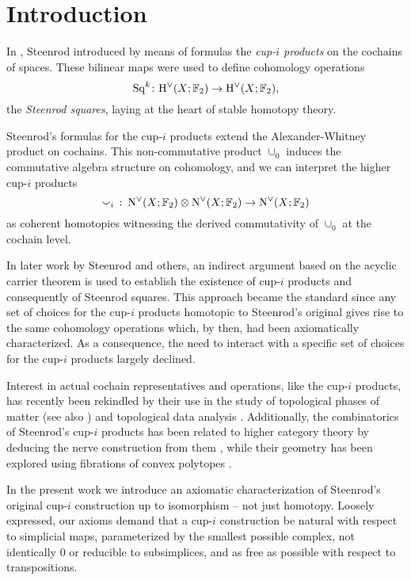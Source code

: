 
\section{Introduction} \label{s:introduction}

In \cite{steenrod1947products}, Steenrod introduced by means of formulas the \textit{\mbox{cup-$i$} products} on the cochains of spaces.
These bilinear maps were used to define cohomology operations
\[
\mathrm{Sq}^k \colon \mathrm{H}^\vee(X; {\mathbb{F}_2}) \to \mathrm{H}^\vee(X; {\mathbb{F}_2}),
\]
the \textit{Steenrod squares}, laying at the heart of stable homotopy theory.

Steenrod's formulas for the \mbox{cup-$i$} products extend the Alexander-Whitney product on cochains.
This non-commutative product $\cup_0$ induces the commutative algebra structure on cohomology, and we can interpret the higher \mbox{cup-$i$} products
\[
\smallsmile_i\ \colon \operatorname{N^{\vee}}(X; {\mathbb{F}_2}) \otimes \operatorname{N^{\vee}}(X; {\mathbb{F}_2}) \to \operatorname{N^{\vee}}(X; {\mathbb{F}_2})
\]
as coherent homotopies witnessing the derived commutativity of $\cup_0$ at the cochain level.

In later work by Steenrod \cite{steenrod1962cohomology} and others, an indirect argument based on the acyclic carrier theorem is used to establish the existence of \mbox{cup-$i$} products and consequently of Steenrod squares.
This approach became the standard since any set of choices for the \mbox{cup-$i$} products homotopic to Steenrod's original gives rise to the same cohomology operations which, by then, had been axiomatically characterized.
As a consequence, the need to interact with a specific set of choices for the \mbox{cup-$i$} products largely declined.

Interest in actual cochain representatives and operations, like the \mbox{cup-$i$} products, has recently been rekindled by their use in the study of topological phases of matter \cite{gaiotto2016spin, kapustin2017fermionic, barkeshli2021classification} (see also \cite{brumfiel2016pontrjagin,brumfiel2018pontrjagin})
and topological data analysis \cite{carlsson2005barcode, medina2021per_st}.
Additionally, the combinatorics of Steenrod's cup-$i$ products has been related to higher category theory by deducing the nerve construction from them \cite{street1987orientals, medina2020globular}, while their geometry has been explored using fibrations of convex polytopes \cite{medina2022fib_poly}.

In the present work we introduce an axiomatic characterization of Steenrod's original cup-$i$ construction up to isomorphism -- not just homotopy.
Loosely expressed, our axioms demand that a cup-$i$ construction be natural with respect to simplicial maps, parameterized by the smallest possible complex, not identically $0$ or reducible to subsimplices, and as free as possible with respect to transpositions.

